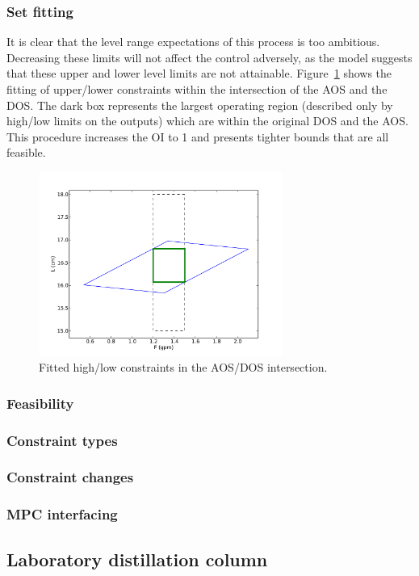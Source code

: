\subsubsection{Set fitting}
It is clear that the level range expectations of this process is too ambitious.
Decreasing these limits will not affect the control adversely, as the model suggests that these upper and lower level limits are not attainable.
Figure~\ref{fig:flowfitbox} shows the fitting of upper/lower constraints within the intersection of the AOS and the DOS.
The dark box represents the largest operating region (described only by high/low limits on the outputs) which are within the original DOS and the AOS.
This procedure increases the OI to 1 and presents tighter bounds that are all feasible.

\begin{figure}[htbp]
  \centering
    \includegraphics[width=8cm]{graph/flowfitbox.pdf}
  \caption{Fitted high/low constraints in the AOS/DOS intersection.}
  \label{fig:flowfitbox}
\end{figure}
\subsubsection{Feasibility}
\subsubsection{Constraint types}
\subsubsection{Constraint changes}
\subsubsection{MPC interfacing}

\subsection{Laboratory distillation column}
